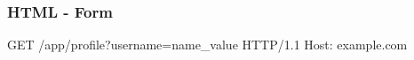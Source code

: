 \begin{frame}[fragile]
 	\frametitle{HTML - Form}
   
   \footnotesize
   GET /app/profile?username=name\_value HTTP/1.1 \newline
   Host: example.com \newline
\end{frame}